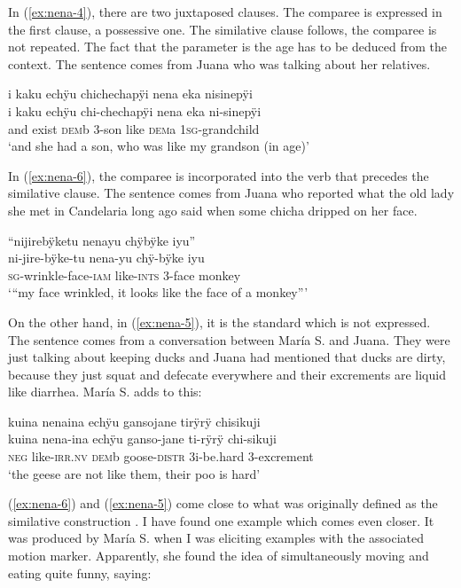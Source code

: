 In (\ref{ex:nena-4}), there are two juxtaposed clauses. The comparee is expressed in the first clause, a possessive one. The similative clause follows, the comparee is not repeated. The fact that the parameter is the age has to be deduced from the context. The sentence comes from Juana who was talking about her relatives.

\ea\label{ex:nena-4}
\begingl
\glpreamble i kaku echÿu chichechapÿi nena eka nisinepÿi\\
\gla i kaku echÿu chi-chechapÿi nena eka ni-sinepÿi\\
\glb and exist \textsc{dem}b 3-son like \textsc{dem}a 1\textsc{sg}-grandchild\\
\glft ‘and she had a son, who was like my grandson (in age)’
\endgl
\trailingcitation{[jxx-p120430l-2.163]}
\xe

In (\ref{ex:nena-6}), the comparee is incorporated into the verb that precedes the similative clause. The sentence comes from Juana who reported what the old lady she met in Candelaria long ago said when some chicha dripped on her face.

\ea\label{ex:nena-6}
\begingl
\glpreamble “nijirebÿketu nenayu chÿbÿke iyu”\\
\gla ni-jire-bÿke-tu nena-yu chÿ-bÿke iyu\\
\textsc{sg}-wrinkle-face-\textsc{iam} like-\textsc{ints} 3-face monkey\\
\glft ‘“my face wrinkled, it looks like the face of a monkey”’
\endgl
\trailingcitation{[jxx-p120515l-1.075]}
\xe

On the other hand, in (\ref{ex:nena-5}), it is the standard which is not expressed. The sentence comes from a conversation between María S. and Juana. They were just talking about keeping ducks and Juana had mentioned that ducks are dirty, because they just squat and defecate everywhere and their excrements are liquid like diarrhea. María S. adds to this:

\ea\label{ex:nena-5}
\begingl
\glpreamble kuina nenaina echÿu gansojane tirÿrÿ chisikuji\\
\gla kuina nena-ina echÿu ganso-jane ti-rÿrÿ chi-sikuji\\
\glb \textsc{neg} like-\textsc{irr.nv} \textsc{dem}b goose-\textsc{distr} 3i-be.hard 3-excrement\\
\glft ‘the geese are not like them, their poo is hard’
\endgl
{}
\xe

(\ref{ex:nena-6}) and (\ref{ex:nena-5}) come close to what was originally defined as the similative construction \citep[cf.][277]{HaspelmathBuchholz1998}. I have found one example which comes even closer. It was produced by María S. when I was eliciting examples with the associated motion marker. Apparently, she found the idea of simultaneously moving and eating quite funny, saying:

